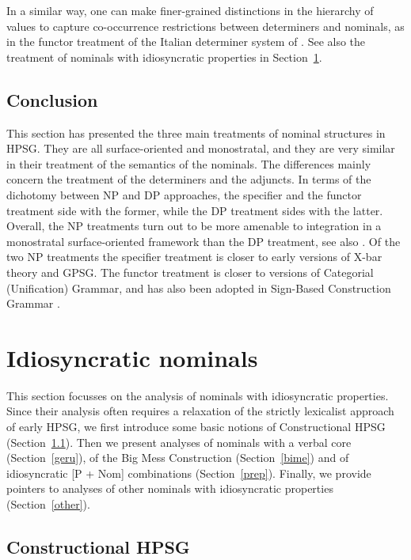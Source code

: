 \documentclass[output=paper
                ,modfonts
                ,nonflat
	        ,collection
	        ,collectionchapter
	        ,collectiontoclongg
 	        ,biblatex
                ,babelshorthands
                ,newtxmath
                ,draftmode
                ,colorlinks, citecolor=brown
]{./langsci/langscibook}
\begin{document}
In a similar way, one can make finer-grained distinctions in the hierarchy of  
 values to capture co-occurrence restrictions between determiners and 
nominals, as in the functor treatment of the Italian determiner system of 
\citet{Allegranza06}. See also the treatment of nominals with idiosyncratic properties 
in Section~\ref{idio}. 


\subsection{Conclusion} 


This section has presented the three main treatments of nominal structures in HPSG. 
They are all surface-oriented and monostratal, and they are very similar in their 
treatment of the semantics of the nominals. 
The differences mainly concern the treatment of the determiners and the adjuncts. 
In terms of the dichotomy between NP and DP approaches, the specifier and the functor 
treatment side with the former, while the DP treatment sides with the latter. 
Overall, the NP treatments turn out to be more amenable to integration  
in a monostratal surface-oriented framework than the DP treatment, see also \citet{MuellerHeadless}. 
Of the two NP treatments
the specifier treatment is closer to early versions of X-bar theory and GPSG.   
The functor treatment is closer to versions of Categorial (Unification) Grammar, and 
has also been adopted in Sign-Based Construction Grammar \citep[155--157]{Sag2012}.

 

\section{Idiosyncratic nominals}
\label{idio}


This section focusses on the analysis of nominals with idiosyncratic properties. 
Since their analysis often requires a relaxation of the strictly lexicalist approach 
of early HPSG, we first introduce some basic notions of Constructional HPSG (Section~\ref{cohp}). Then we present analyses of nominals with a verbal core (Section~\ref{geru}), 
of the Big Mess Construction (Section~\ref{bime}) and of idiosyncratic [P + Nom] combinations 
(Section~\ref{prep}). Finally, we provide pointers to analyses of other nominals with 
idiosyncratic properties (Section~\ref{other}). 


\subsection{Constructional HPSG} 
\label{cohp}
\end{document}
